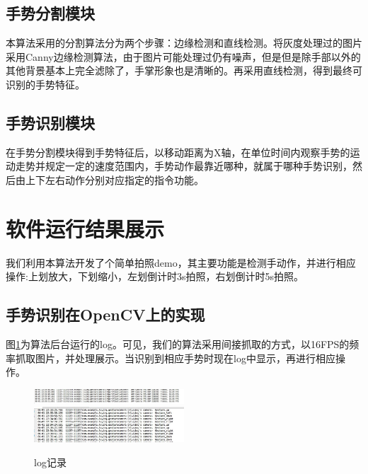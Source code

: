 \documentclass{XDBAthesis}
\begin{document}
\subsection{手势分割模块}

    本算法采用的分割算法分为两个步骤：边缘检测和直线检测。将灰度处理过的图片采用Canny边缘检测算法，由于图片可能处理过仍有噪声，但是但是除手部以外的其他背景基本上完全滤除了，手掌形象也是清晰的。再采用直线检测，得到最终可识别的手势特征。

\subsection{手势识别模块}

在手势分割模块得到手势特征后，以移动距离为X轴，在单位时间内观察手势的运动走势并规定一定的速度范围内，手势动作最靠近哪种，就属于哪种手势识别，然后由上下左右动作分别对应指定的指令功能。
\section{软件运行结果展示}
我们利用本算法开发了个简单拍照demo，其主要功能是检测手动作，并进行相应操作:上划放大，下划缩小，左划倒计时3s拍照，右划倒计时5s拍照。
\subsection{手势识别在OpenCV上的实现}
图\ref{fg:1}为算法后台运行的log。可见，我们的算法采用间接抓取的方式，以16FPS的频率抓取图片，并处理展示。当识别到相应手势时现在log中显示，再进行相应操作。
\begin{figure}[htb]
    \centering
    \includegraphics[width=0.5\textwidth ]{figure/opencvframe}%
    \includegraphics[width=0.5\textwidth ]{figure/gesture}
    \caption{log记录}
    \label{fg:1}
\end{figure}
\end{document}
